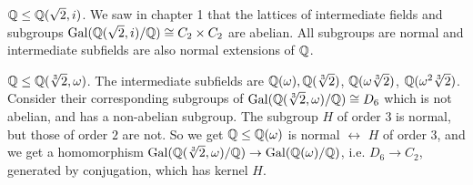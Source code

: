 \documentclass[a4paper]{article}
\begin{document}
\begin{eg}
$\mathbb{Q} \leq \mathbb{Q}(\sqrt{2},i)$. We saw in chapter 1 that the lattices of intermediate fields and subgroups $\operatorname{Gal}(\mathbb{Q}(\sqrt{2},i) / \mathbb{Q}) \cong C_2 \times C_2$ are abelian. All subgroups are normal and intermediate subfields are also normal extensions of $\mathbb{Q}$.
\end{eg}

\begin{eg}
$\mathbb{Q} \leq \mathbb{Q}(\sqrt[3]{2},\omega)$. The intermediate subfields are $\mathbb{Q}(\omega),\mathbb{Q}(\sqrt[3]{2})$, $\mathbb{Q}(\omega\sqrt[3]{2})$, $\mathbb{Q}(\omega^2\sqrt[3]{2})$. Consider their corresponding subgroups of $\operatorname{Gal}(\mathbb{Q}(\sqrt[3]{2},\omega)/\mathbb{Q}) \cong D_6$ which is not abelian, and has a non-abelian subgroup. The subgroup $H$ of order 3 is normal, but those of order $2$ are not. So we get $\mathbb{Q} \leq \mathbb{Q}(\omega)$ is normal $\leftrightarrow$ $H$ of order 3, and we get a homomorphism $\operatorname{Gal}(\mathbb{Q}(\sqrt[3]{2},\omega)/\mathbb{Q}) \to \operatorname{Gal}(\mathbb{Q}(\omega)/\mathbb{Q})$, i.e. $D_6 \to C_2$, generated by conjugation, which has kernel $H$.
\end{eg}
\end{document}
